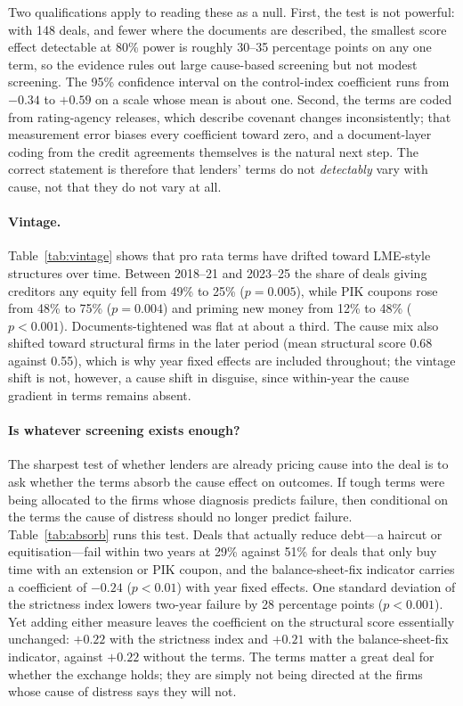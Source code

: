 \documentclass[12pt]{article}
\begin{document}


Two qualifications apply to reading these as a null. First, the test is not powerful: with 148 deals, and fewer where the documents are described, the smallest score effect detectable at 80\% power is roughly 30--35 percentage points on any one term, so the evidence rules out large cause-based screening but not modest screening. The 95\% confidence interval on the control-index coefficient runs from $-0.34$ to $+0.59$ on a scale whose mean is about one. Second, the terms are coded from rating-agency releases, which describe covenant changes inconsistently; that measurement error biases every coefficient toward zero, and a document-layer coding from the credit agreements themselves is the natural next step. The correct statement is therefore that lenders' terms do not \emph{detectably} vary with cause, not that they do not vary at all.

\paragraph{Vintage.} Table~\ref{tab:vintage} shows that pro rata terms have drifted toward LME-style structures over time. Between 2018--21 and 2023--25 the share of deals giving creditors any equity fell from 49\% to 25\% ($p = 0.005$), while PIK coupons rose from 48\% to 75\% ($p = 0.004$) and priming new money from 12\% to 48\% ($p < 0.001$). Documents-tightened was flat at about a third. The cause mix also shifted toward structural firms in the later period (mean structural score 0.68 against 0.55), which is why year fixed effects are included throughout; the vintage shift is not, however, a cause shift in disguise, since within-year the cause gradient in terms remains absent.



\paragraph{Is whatever screening exists enough?} The sharpest test of whether lenders are already pricing cause into the deal is to ask whether the terms absorb the cause effect on outcomes. If tough terms were being allocated to the firms whose diagnosis predicts failure, then conditional on the terms the cause of distress should no longer predict failure. Table~\ref{tab:absorb} runs this test. Deals that actually reduce debt---a haircut or equitisation---fail within two years at 29\% against 51\% for deals that only buy time with an extension or PIK coupon, and the balance-sheet-fix indicator carries a coefficient of $-0.24$ ($p < 0.01$) with year fixed effects. One standard deviation of the strictness index lowers two-year failure by 28 percentage points ($p < 0.001$). Yet adding either measure leaves the coefficient on the structural score essentially unchanged: $+0.22$ with the strictness index and $+0.21$ with the balance-sheet-fix indicator, against $+0.22$ without the terms. The terms matter a great deal for whether the exchange holds; they are simply not being directed at the firms whose cause of distress says they will not.
\end{document}

